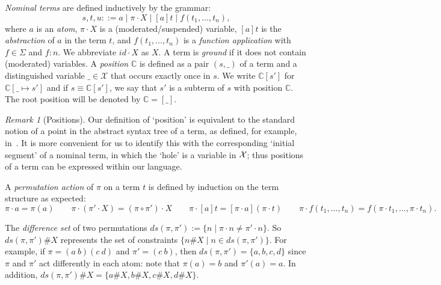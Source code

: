 \documentclass[11pt,a4paper]{amsart}
\newcommand{\dani}[1]{\textcolor{orange}{#1}}
\newcommand{\pAction}[2]{#1\cdot #2}
\newcommand{\abs}[2]{[#1]#2}
\newcommand{\context}[1]{\mathbb{C}}
\theoremstyle{plain}
\theoremstyle{definition}
\newtheorem{definition}[theorem]{Definition}
\theoremstyle{remark}
\newtheorem{remark}[theorem]{Remark}
\begin{document}
{\em Nominal terms} are defined  inductively by the grammar:
 $$ s,t,u ::= a \mid \pAction{\pi}{X} \mid  \abs{a}{t} \mid f(t_1, \ldots, t_n),$$
where \(a\) is an {\em atom}, \(\pAction{\pi}{X}\) is a (moderated/suspended) variable, \(\abs{a}{t}\) is the {\em abstraction} of \(a\) in the term \(t\), and \(f(t_1, \ldots, t_n)\) is a {\em function application} with \(f \in \Sigma\) and \(f:n\).  We abbreviate $id\cdot X$ as $X$. A term is \textit{ground} if it does not contain (moderated) variables. 
A \emph{position} $\context{C}$ is defined as a pair $(s, \_)$ of a term and a distinguished variable $\_ \in \mathcal{X}$ that occurs exactly once in $s$. We write $\context{C}[s']$ for $\context{C}[\_ \mapsto s']$ and if $s\equiv \context{C}[s']$, we say that $s'$ is a subterm of $s$ with position $\context{C}$. The root position will be denoted by $\context{C} = [\_]$. 

\begin{remark}[Positions]
  Our definition of ‘position’ is equivalent to the standard notion of a point in the abstract syntax tree of a term, as defined, for example, in~\cite{Baader98}. It is more convenient for us to identify this with the corresponding ‘initial segment’ of a nominal term, in which the `hole' is a variable in ${\cal X}$; thus positions of a term can be expressed within our language.
\end{remark} 


     



A \emph{permutation action} of $\pi$ on a term $t$ is defined by induction on the term structure as expected:
$$\pi\cdot a = \pi(a) \qquad \pi \cdot (\pi'\cdot X) = (\pi \circ \pi')\cdot X \qquad \pi\cdot [a]t = [\pi\cdot a](\pi\cdot t) \qquad \pi\cdot f(t_1,\ldots, t_n) = f(\pi\cdot t_1, \ldots, \pi\cdot t_n).$$

The \emph{difference set} of two permutations
$ds(\pi,\pi') := \{ n \; | \; \pi\cdot n \neq \pi'\cdot n \}$. So $ds(\pi,\pi')\# X$ represents the set of constraints $\{ n\# X \; | \; n \in ds(\pi,\pi') \}$. For example, if $\pi = (a \ b)(c \ d)$ and $\pi' = (c \ b)$, then $ds(\pi,\pi') = \{a,b,c,d\}$ since $\pi$ and $\pi'$ act differently in each atom: note that $\pi(a)=b$ and $\pi'(a)=a$. In addition,  $ds(\pi,\pi')\# X = \{a\#X,b\#X,c\#X,d\#X\}$. 
\end{document}

